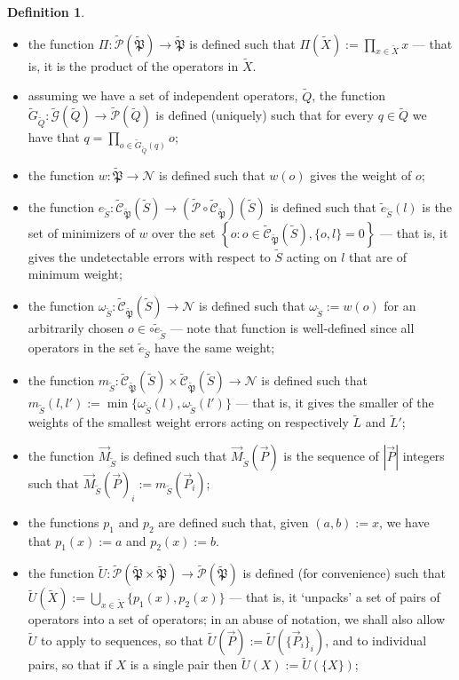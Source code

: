 \documentclass{amsbook}
\theoremstyle{plain}
\theoremstyle{definition}
\newtheorem{definition}{Definition}
\theoremstyle{remark}
\newcommand{\lst}{\vec}
\newcommand{\set}{\tilde}
\newcommand{\genfun}{\tilde{\mathcal{G}}}
\newcommand{\pauligroup}{{\set{\mathfrak{P}}}}
\newcommand{\powerset}{\set{\mathcal{P}}}
\newcommand{\centralizer}{\set{\mathcal{C}}}
\newcommand{\om}{\omega}
\newcommand{\paren}[1]{\left(#1\right)}
\begin{document}
\begin{definition}
$\quad$

\begin{itemize}
\item the function $\Pi:\powerset(\pauligroup)\to\pauligroup$ is defined such that $\Pi(\set X):=\prod_{x\in \set X} x$ --- that is, it is the product of the operators in $\set X$.
\item assuming we have a set of independent operators, $\set Q$, the function $\set G_{\set Q}:\genfun(\set Q)\to\powerset(\set Q)$ is defined (uniquely) such that for every $q\in\set Q$ we have that $q=\prod_{o\in\set G_{\set Q}(q)} o$;
\item the function $w:\pauligroup\to \mathscr{N}$ is defined such that $w(o)$ gives the weight of $o$;
\item the function $e_{\set S}:\centralizer_\pauligroup\paren{\set S}\to \paren{\powerset\circ\centralizer_\pauligroup}\paren{\set S}$ is defined such that $\set e_{\set S}(l)$ is the set of minimizers of $w$ over the set $\left\{o: o\in \centralizer_\pauligroup\paren{\set S}, \{o,l\}=0\right\}$ --- that is, it gives the undetectable errors with respect to $\set S$ acting on $l$ that are of minimum weight;
\item the function $\om_{\set S}:\centralizer_\pauligroup\paren{\set S}\to\mathscr{N}$ is defined such that $\om_{\set S}:=w(o)$ for an arbitrarily chosen $o\in\circ \set e_{\set S}$ --- note that function is well-defined since all operators in the set $\set e_{\set S}$ have the same weight;
\item the function $m_{\set S}:\centralizer_\pauligroup\paren{\set S}\times \centralizer_\pauligroup\paren{\set S} \to \mathscr{N}$ is defined such that $m_{\set S}(l,l'):=\min \{\om_{\set S}(l),\om_{\set S}(l')\}$ --- that is, it gives the smaller of the weights of the smallest weight errors acting on respectively $\set L$ and $\set L'$;
\item the function $\lst M_{\set S}$ is defined such that $\lst M_{\set S}\paren{\lst P}$ is the sequence of $|\lst P|$ integers such that $\lst M_{\set S}\paren{\lst P}_i := m_{\set S}\paren{\lst P_i}$;
\item the functions $p_1$ and $p_2$ are defined such that, given $(a,b):=x$, we have that $p_1(x):=a$ and $p_2(x):=b$.
\item the function $\set U:\powerset(\pauligroup\times\pauligroup)\to\powerset(\pauligroup)$ is defined (for convenience) such that $\set U\paren{\set X}:=\bigcup_{x\in\set X} \{p_1(x),p_2(x)\}$ --- that is, it `unpacks' a set of pairs of operators into a set of operators;  in an abuse of notation, we shall also allow $\set U$ to apply to sequences, so that $\set U(\lst P) := \set U\paren{\{\lst P_i\}_i}$, and to individual pairs, so that if $X$ is a single pair then $\set U(X) := \set U(\{X\})$;

\end{itemize}
\end{definition}
\end{document}
